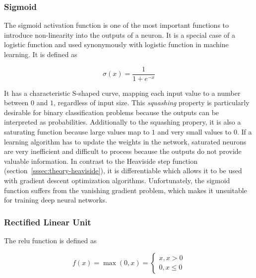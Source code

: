 \documentclass[draft,final]{vutinfth} %
\begin{document}
\subsubsection{Sigmoid}
\label{sssec:theory-sigmoid}

The sigmoid activation function is one of the most important functions
to introduce non-linearity into the outputs of a neuron. It is a
special case of a logistic function and used synonymously with
logistic function in machine learning. It is defined as

\begin{equation}
  \label{eq:sigmoid}
  \sigma(x) = \frac{1}{1 + e^{-x}}
\end{equation}

It has a characteristic S-shaped curve, mapping each input value to a
number between $0$ and $1$, regardless of input size. This
\emph{squashing} property is particularly desirable for binary
classification problems because the outputs can be interpreted as
probabilities. Additionally to the squashing propery, it is also a
saturating function because large values map to $1$ and very small
values to $0$. If a learning algorithm has to update the weights in
the network, saturated neurons are very inefficient and difficult to
process because the outputs do not provide valuable information. In
contrast to the Heaviside step function
(section~\ref{sssec:theory-heaviside}), it is differentiable which
allows it to be used with gradient descent optimization
algorithms.  Unfortunately, the sigmoid function suffers from
the vanishing gradient problem, which makes it unsuitable for training
deep neural networks.

\subsubsection{Rectified Linear Unit}
\label{sssec:theory-relu}

The \gls{relu} function is defined as

\begin{equation}
  \label{eq:relu}
  f(x) = \max(0, x) =
  \begin{cases}
    x, x > 0 \\
    0, x \leq 0
  \end{cases}
\end{equation}
\end{document}
